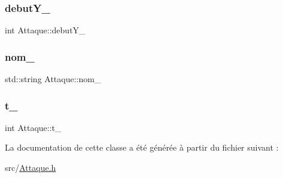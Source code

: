 \subsubsection{\texorpdfstring{debut\+Y\+\_\+}{debutY\_}}
{\footnotesize\ttfamily int Attaque\+::debut\+Y\+\_\+\hspace{0.3cm}{\ttfamily [protected]}}

\mbox{\label{class_attaque_ad3028f07f65f69a371f159f89a0c82a9}} 
\subsubsection{\texorpdfstring{nom\+\_\+}{nom\_}}
{\footnotesize\ttfamily std\+::string Attaque\+::nom\+\_\+\hspace{0.3cm}{\ttfamily [protected]}}

\mbox{\label{class_attaque_adcf78793a4bb4ac9c1928615e0aea112}} 
\subsubsection{\texorpdfstring{t\+\_\+}{t\_}}
{\footnotesize\ttfamily int Attaque\+::t\+\_\+\hspace{0.3cm}{\ttfamily [protected]}}



La documentation de cette classe a été générée à partir du fichier suivant \+:\begin{DoxyCompactItemize}
\item 
src/\hyperlink{_attaque_8h}{Attaque.\+h}\end{DoxyCompactItemize}

